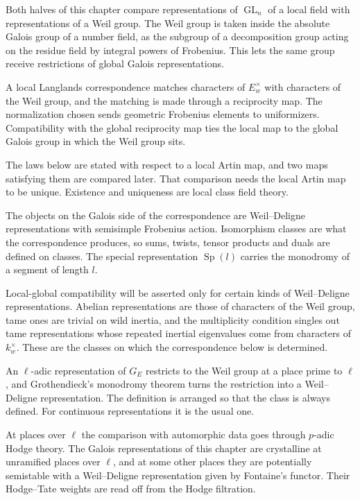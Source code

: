 Both halves of this chapter compare representations of $\operatorname{GL}_n$ of a local field with
representations of a Weil group. The Weil group is taken inside the absolute Galois group of a number
field, as the subgroup of a decomposition group acting on the residue field by integral powers of
Frobenius. This lets the same group receive restrictions of global Galois representations.

A local Langlands correspondence matches characters of $E_w^\times$ with characters of the Weil
group, and the matching is made through a reciprocity map. The normalization chosen sends geometric
Frobenius elements to uniformizers. Compatibility with the global reciprocity map ties the local map
to the global Galois group in which the Weil group sits.

The laws below are stated with respect to a local Artin map, and two maps satisfying them are
compared later. That comparison needs the local Artin map to be unique. Existence and uniqueness are
local class field theory.

The objects on the Galois side of the correspondence are Weil--Deligne representations with
semisimple Frobenius action. Isomorphism classes are what the correspondence produces, so sums,
twists, tensor products and duals are defined on classes. The special representation
$\operatorname{Sp}(l)$ carries the monodromy of a segment of length $l$.

Local-global compatibility will be asserted only for certain kinds of Weil--Deligne
representations. Abelian representations are those of characters of the Weil group, tame ones are
trivial on wild inertia, and the multiplicity condition singles out tame representations whose
repeated inertial eigenvalues come from characters of $k_w^\times$. These are the classes on which
the correspondence below is determined.

An $\ell$-adic representation of $G_E$ restricts to the Weil group at a place prime to $\ell$, and
Grothendieck's monodromy theorem turns the restriction into a Weil--Deligne representation. The
definition is arranged so that the class is always defined. For continuous representations it is the
usual one.

At places over $\ell$ the comparison with automorphic data goes through $p$-adic Hodge theory. The
Galois representations of this chapter are crystalline at unramified places over $\ell$, and at some
other places they are potentially semistable with a Weil--Deligne representation given by Fontaine's
functor. Their Hodge--Tate weights are read off from the Hodge filtration.

